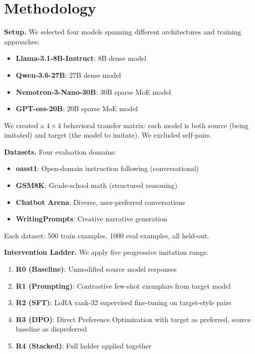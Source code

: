 \documentclass[11pt]{article}
\begin{document}
\section{Methodology}

\textbf{Setup.} We selected four models spanning different architectures and training approaches:
\begin{itemize}
  \item \textbf{Llama-3.1-8B-Instruct}: 8B dense model
  \item \textbf{Qwen-3.6-27B}: 27B dense model
  \item \textbf{Nemotron-3-Nano-30B}: 30B sparse MoE model
  \item \textbf{GPT-oss-20B}: 20B sparse MoE model
\end{itemize}

We created a $4 \times 4$ behavioral transfer matrix: each model is both source (being imitated) and target (the model to imitate). We excluded self-pairs.

\textbf{Datasets.} Four evaluation domains:
\begin{itemize}
  \item \textbf{oasst1}: Open-domain instruction following (conversational)
  \item \textbf{GSM8K}: Grade-school math (structured reasoning)
  \item \textbf{Chatbot Arena}: Diverse, user-preferred conversations
  \item \textbf{WritingPrompts}: Creative narrative generation
\end{itemize}

Each dataset: 500 train examples, 1000 eval examples, all held-out.

\textbf{Intervention Ladder.} We apply five progressive imitation rungs:
\begin{enumerate}
  \item \textbf{R0 (Baseline)}: Unmodified source model responses
  \item \textbf{R1 (Prompting)}: Contrastive few-shot exemplars from target model
  \item \textbf{R2 (SFT)}: LoRA rank-32 supervised fine-tuning on target-style pairs
  \item \textbf{R3 (DPO)}: Direct Preference Optimization with target as preferred, source baseline as dispreferred
  \item \textbf{R4 (Stacked)}: Full ladder applied together
\end{enumerate}
\end{document}
